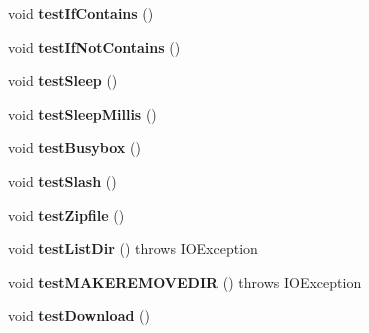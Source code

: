 \begin{DoxyCompactItemize}
\item 
\hypertarget{classCASUAL_1_1CASUALLanguageTest_a3e358414cbcb94d26af423d3a8240e87}{void {\bfseries test\-If\-Contains} ()}\label{classCASUAL_1_1CASUALLanguageTest_a3e358414cbcb94d26af423d3a8240e87}

\item 
\hypertarget{classCASUAL_1_1CASUALLanguageTest_a16c61a376aed9a252ce6c92d15e42bf4}{void {\bfseries test\-If\-Not\-Contains} ()}\label{classCASUAL_1_1CASUALLanguageTest_a16c61a376aed9a252ce6c92d15e42bf4}

\item 
\hypertarget{classCASUAL_1_1CASUALLanguageTest_afd7bda03bf2755586046ceee7d4ca82e}{void {\bfseries test\-Sleep} ()}\label{classCASUAL_1_1CASUALLanguageTest_afd7bda03bf2755586046ceee7d4ca82e}

\item 
\hypertarget{classCASUAL_1_1CASUALLanguageTest_af9cfcfcbd98fb9e8d7200b118d7b5e84}{void {\bfseries test\-Sleep\-Millis} ()}\label{classCASUAL_1_1CASUALLanguageTest_af9cfcfcbd98fb9e8d7200b118d7b5e84}

\item 
\hypertarget{classCASUAL_1_1CASUALLanguageTest_a94531df329d6164fe92a69eac020e953}{void {\bfseries test\-Busybox} ()}\label{classCASUAL_1_1CASUALLanguageTest_a94531df329d6164fe92a69eac020e953}

\item 
\hypertarget{classCASUAL_1_1CASUALLanguageTest_a7728d972dc8153ed07d4d4542cb46027}{void {\bfseries test\-Slash} ()}\label{classCASUAL_1_1CASUALLanguageTest_a7728d972dc8153ed07d4d4542cb46027}

\item 
\hypertarget{classCASUAL_1_1CASUALLanguageTest_a1096c195055eb1096756d072b08d9f21}{void {\bfseries test\-Zipfile} ()}\label{classCASUAL_1_1CASUALLanguageTest_a1096c195055eb1096756d072b08d9f21}

\item 
\hypertarget{classCASUAL_1_1CASUALLanguageTest_afd85d33a57e8531aeea4d47cb257a1f8}{void {\bfseries test\-List\-Dir} ()  throws I\-O\-Exception }\label{classCASUAL_1_1CASUALLanguageTest_afd85d33a57e8531aeea4d47cb257a1f8}

\item 
\hypertarget{classCASUAL_1_1CASUALLanguageTest_a20200257398e867c989eb83135696744}{void {\bfseries test\-M\-A\-K\-E\-R\-E\-M\-O\-V\-E\-D\-I\-R} ()  throws I\-O\-Exception }\label{classCASUAL_1_1CASUALLanguageTest_a20200257398e867c989eb83135696744}

\item 
\hypertarget{classCASUAL_1_1CASUALLanguageTest_a48f7196eda87914a970bebea434a710d}{void {\bfseries test\-Download} ()}\label{classCASUAL_1_1CASUALLanguageTest_a48f7196eda87914a970bebea434a710d}

\end{DoxyCompactItemize}
